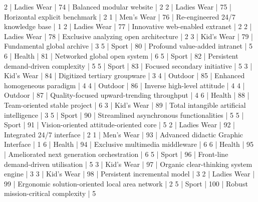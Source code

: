 \begin{enumerate}
\begin{pseudo*}
      2 | Ladies Wear |      74 | Balanced modular website                         |        2   
      2 | Ladies Wear |      75 | Horizontal explicit benchmark                    |        2   
      1 | Men's Wear  |      76 | Re-engineered 24/7 knowledge base                |        1   
      2 | Ladies Wear |      77 | Innovative web-enabled extranet                  |        2   
      2 | Ladies Wear |      78 | Exclusive analyzing open architecture            |        2   
      3 | Kid's Wear  |      79 | Fundamental global archive                       |        3   
      5 | Sport       |      80 | Profound value-added intranet                    |        5   
      6 | Health      |      81 | Networked global open system                     |        6   
      5 | Sport       |      82 | Persistent demand-driven complexity              |        5   
      5 | Sport       |      83 | Focused secondary initiative                     |        5   
      3 | Kid's Wear  |      84 | Digitized tertiary groupware                     |        3   
      4 | Outdoor     |      85 | Enhanced homogeneous paradigm                    |        4   
      4 | Outdoor     |      86 | Inverse high-level attitude                      |        4   
      4 | Outdoor     |      87 | Quality-focused upward-trending throughput       |        4   
      6 | Health      |      88 | Team-oriented stable project                     |        6   
      3 | Kid's Wear  |      89 | Total intangible artificial intelligence         |        3   
      5 | Sport       |      90 | Streamlined asynchronous functionalities         |        5   
      5 | Sport       |      91 | Vision-oriented attitude-oriented core           |        5   
      2 | Ladies Wear |      92 | Integrated 24/7 interface                        |        2   
      1 | Men's Wear  |      93 | Advanced didactic Graphic Interface              |        1   
      6 | Health      |      94 | Exclusive multimedia middleware                  |        6   
      6 | Health      |      95 | Ameliorated next generation orchestration        |        6   
      5 | Sport       |      96 | Front-line demand-driven utilisation             |        5   
      3 | Kid's Wear  |      97 | Organic clear-thinking system engine             |        3   
      3 | Kid's Wear  |      98 | Persistent incremental model                     |        3   
      2 | Ladies Wear |      99 | Ergonomic solution-oriented local area network   |        2   
      5 | Sport       |     100 | Robust mission-critical complexity               |        5   

\end{pseudo*}
\end{enumerate}
